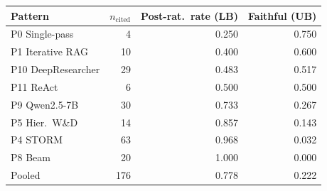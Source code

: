 \begin{tabular}{lrrr}
\toprule
Pattern & $n_{\mathrm{cited}}$ & Post-rat.\ rate (LB) & Faithful (UB)\\
\midrule
P0 Single-pass & 4 & 0.250 & 0.750\\
P1 Iterative RAG & 10 & 0.400 & 0.600\\
P10 DeepResearcher & 29 & 0.483 & 0.517\\
P11 ReAct & 6 & 0.500 & 0.500\\
P9 Qwen2.5-7B & 30 & 0.733 & 0.267\\
P5 Hier.\ W\&D & 14 & 0.857 & 0.143\\
P4 STORM & 63 & 0.968 & 0.032\\
P8 Beam & 20 & 1.000 & 0.000\\
\midrule
Pooled & 176 & 0.778 & 0.222\\
\bottomrule
\end{tabular}
